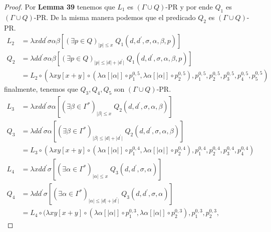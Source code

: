 \begin{proof}
    \PN Por \textbf{Lemma 39} tenemos que $L_{1}$ es $(\Gamma \cup Q)$-PR y por ende $Q_{1}$ es $(\Gamma \cup Q)$-PR. De
    la misma manera podemos que el predicado $Q_{2}$ es $(\Gamma \cup Q)$-PR.
    \begin{align*}
      L_2 &= \lambda xdd^{\prime}\sigma\alpha\beta \left[(\exists p \in Q)_{\lvert p \rvert \leq x} \;
             Q_{1}(d,d^{\prime},\sigma,\alpha,\beta,p)\right] \\
      Q_2 &= \lambda dd^{\prime}\sigma\alpha\beta \left[(\exists p \in Q)_{\lvert p \rvert \leq \lvert d \rvert +
             \lvert d^{\prime} \rvert} \; Q_{1}(d,d^{\prime},\sigma,\alpha,\beta,p)\right] \\
          &= L_2 \circ (\lambda xy \left[x + y\right] \circ(\lambda \alpha \left[\lvert\alpha\rvert\right] \circ
             p_{1}^{0,5}, \lambda \alpha \left[\lvert\alpha\rvert\right] \circ p_{2}^{0,5}), p_{1}^{0,5}, p_{2}^{0,5},
             p_{3}^{0,5}, p_{4}^{0,5}, p_{5}^{0,5})
    \end{align*}
    \PN finalmente, tenemos que $Q_{3}, Q_{4}, Q_{5}$ son $(\Gamma \cup Q)$-PR.
    \begin{align*}
      L_3 &= \lambda xdd^{\prime}\sigma\alpha \left[(\exists \beta \in \Gamma^{\ast})_{\lvert\beta\rvert \leq x} \;
             Q_{2}(d,d^{\prime},\sigma,\alpha,\beta)\right] \\
      Q_3 &= \lambda dd^{\prime}\sigma\alpha \left[(\exists \beta \in \Gamma^{\ast})_{\lvert\beta\rvert \leq \lvert d
             \rvert + \lvert d^{\prime} \rvert} \; Q_{2}(d,d^{\prime},\sigma,\alpha,\beta)\right] \\
          &= L_3 \circ (\lambda xy \left[x + y\right] \circ(\lambda \alpha \left[\lvert\alpha\rvert\right] \circ
             p_{1}^{0,4}, \lambda \alpha \left[\lvert\alpha\rvert\right] \circ p_{2}^{0,4}), p_{1}^{0,4}, p_{2}^{0,4},
             p_{3}^{0,4}, p_{4}^{0,4}) \\[10pt]
      L_4 &= \lambda xdd^{\prime}\sigma \left[(\exists \alpha \in \Gamma^{\ast})_{\lvert\alpha\rvert \leq x} \;
             Q_{3}(d,d^{\prime},\sigma,\alpha)\right] \\
      Q_4 &= \lambda dd^{\prime}\sigma \left[(\exists \alpha \in \Gamma^{\ast})_{\lvert\alpha\rvert \leq \lvert d
             \rvert + \lvert d^{\prime} \rvert} \; Q_{3}(d,d^{\prime},\sigma,\alpha)\right] \\
          &= L_4 \circ (\lambda xy \left[x + y\right] \circ(\lambda \alpha \left[\lvert\alpha\rvert\right] \circ
             p_{1}^{0,3}, \lambda \alpha \left[\lvert\alpha\rvert\right] \circ p_{2}^{0,3}), p_{1}^{0,3}, p_{2}^{0,3},

\end{align*}
\end{proof}
